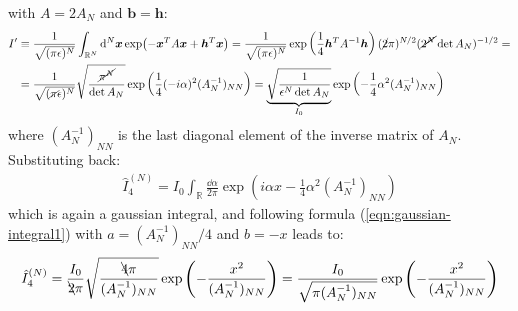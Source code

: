 \documentclass[../template.tex]{subfiles}
\begin{document}
with $A = 2 A_N$ and $\bm{b} = \bm{h}$:
\begin{align*}
    I' &\equiv \frac{1}{\sqrt{(\pi \epsilon)^N}} \int_{\mathbb{R}^N} \dd[N]{\bm{x}} \exp(-\bm{x}^T A \bm{x} + \bm{h}^T \bm{x}) = \frac{1}{\sqrt{(\pi \epsilon)^N}}\exp\left(\frac{1}{4} \bm{h}^T A^{-1} \bm{h} \right) (\cancel{2}\pi)^{N/2} (\cancel{2^N} \operatorname{det}A_N )^{-1/2} =\\
    &= \frac{1}{\sqrt{(\cancel{\pi} \epsilon)^N}}\sqrt{\frac{\cancel{\pi ^N}}{\operatorname{det} A_N } } \exp\left(\frac{1}{4}(-i \alpha)^2 (A^{-1}_N)_{NN} \right) = \underbrace{\sqrt{\frac{1}{\epsilon^N \operatorname{det} A_N} }}_{I_0}  \exp\left(-\frac{1}{4} \alpha^2 (A_N^{-1})_{NN} \right)
\end{align*}
where $(A_N^{-1})_{NN}$ is the last diagonal element of the inverse matrix of $A_N$. Substituting back:
\begin{align*}
    \hat{I}_4^{(N)} = I_0 \int_{\mathbb{R}} \frac{\dd{\alpha}}{2 \pi} \exp\left(i \alpha x - \frac{1}{4} \alpha^2 (A_N^{-1})_{NN} \right)
\end{align*}
which is again a gaussian integral, and following formula (\ref{eqn:gaussian-integral1}) with $a = (A_N^{-1})_{NN}/4$ and $b = -x$ leads to: 
\begin{align}
    \hat{I}_4^{(N)} = \frac{I_0}{\bcancel{2} \pi} \sqrt{\frac{\bcancel{4} \pi}{(A_N^{-1})_{NN}} } \exp\left(-\frac{x^2}{(A_N^{-1})_{NN}} \right) = \frac{I_0}{\sqrt{ \pi (A_N^{-1})_{NN}}} \exp\left(-\frac{x^2}{(A_N^{-1})_{NN}} \right) 
    \label{eqn:latestI4N}
\end{align}
\end{document}
